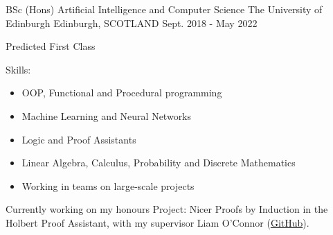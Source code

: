 

\begin{cventries}

  \cventry
    {BSc (Hons) Artificial Intelligence and Computer Science} %
    {The University of Edinburgh} %
    {Edinburgh, SCOTLAND} %
    {Sept. 2018 - May 2022} %
    {
        \begin{cvitems} %
            \item Predicted First Class
            \item Skills:
            \begin{itemize} %
                \item OOP, Functional and Procedural programming
                \item Machine Learning and Neural Networks
                \item Logic and Proof Assistants
                \item Linear Algebra, Calculus, Probability and Discrete Mathematics
                \item Working in teams on large-scale projects
            \end{itemize}
            \item[]
            \item Currently working on my honours Project: Nicer Proofs by Induction in the Holbert Proof Assistant, with my supervisor Liam O'Connor (\href{https://github.com/chrisjpm/holbert}{\textcolor{awesome}{GitHub}}).
        \end{cvitems}
    }

\end{cventries}
